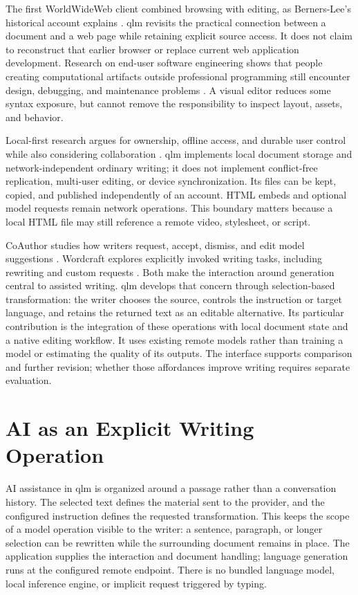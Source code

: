 \documentclass[manuscript,screen,nonacm]{acmart}
\begin{document}
The first WorldWideWeb client combined browsing with editing, as Berners-Lee's historical account explains \cite{bernerslee}. qlm revisits the practical connection between a document and a web page while retaining explicit source access. It does not claim to reconstruct that earlier browser or replace current web application development. Research on end-user software engineering shows that people creating computational artifacts outside professional programming still encounter design, debugging, and maintenance problems \cite{ko}. A visual editor reduces some syntax exposure, but cannot remove the responsibility to inspect layout, assets, and behavior.

Local-first research argues for ownership, offline access, and durable user control while also considering collaboration \cite{localfirst}. qlm implements local document storage and network-independent ordinary writing; it does not implement conflict-free replication, multi-user editing, or device synchronization. Its files can be kept, copied, and published independently of an account. HTML embeds and optional model requests remain network operations. This boundary matters because a local HTML file may still reference a remote video, stylesheet, or script.

CoAuthor studies how writers request, accept, dismiss, and edit model suggestions \cite{coauthor}. Wordcraft explores explicitly invoked writing tasks, including rewriting and custom requests \cite{wordcraft}. Both make the interaction around generation central to assisted writing. qlm develops that concern through selection-based transformation: the writer chooses the source, controls the instruction or target language, and retains the returned text as an editable alternative. Its particular contribution is the integration of these operations with local document state and a native editing workflow. It uses existing remote models rather than training a model or estimating the quality of its outputs. The interface supports comparison and further revision; whether those affordances improve writing requires separate evaluation.

\section{AI as an Explicit Writing Operation}

AI assistance in qlm is organized around a passage rather than a conversation history. The selected text defines the material sent to the provider, and the configured instruction defines the requested transformation. This keeps the scope of a model operation visible to the writer: a sentence, paragraph, or longer selection can be rewritten while the surrounding document remains in place. The application supplies the interaction and document handling; language generation runs at the configured remote endpoint. There is no bundled language model, local inference engine, or implicit request triggered by typing.
\end{document}
